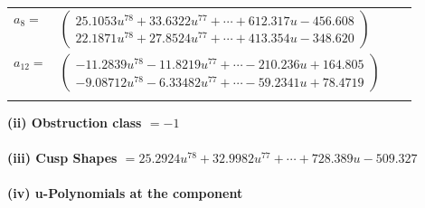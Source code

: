 \documentclass[1p]{elsarticle_modified}
\theoremstyle{definition}
\begin{document}
\begin{tabular}{m{7pt} m{180pt} m{7pt} m{180pt} }
\flushright $a_{8}=$&$\begin{pmatrix}25.1053 u^{78}+33.6322 u^{77}+\cdots+612.317 u-456.608\\22.1871 u^{78}+27.8524 u^{77}+\cdots+413.354 u-348.620\end{pmatrix}$ \\
\flushright $a_{12}=$&$\begin{pmatrix}-11.2839 u^{78}-11.8219 u^{77}+\cdots-210.236 u+164.805\\-9.08712 u^{78}-6.33482 u^{77}+\cdots-59.2341 u+78.4719\end{pmatrix}$\\&\end{tabular}
\flushleft \textbf{(ii) Obstruction class $= -1$}\\~\\
\flushleft \textbf{(iii) Cusp Shapes $= 25.2924 u^{78}+32.9982 u^{77}+\cdots+728.389 u-509.327$}\\~\\
\newpage\renewcommand{\arraystretch}{1}
\flushleft \textbf{(iv) u-Polynomials at the component}\newline \\
\end{document}
